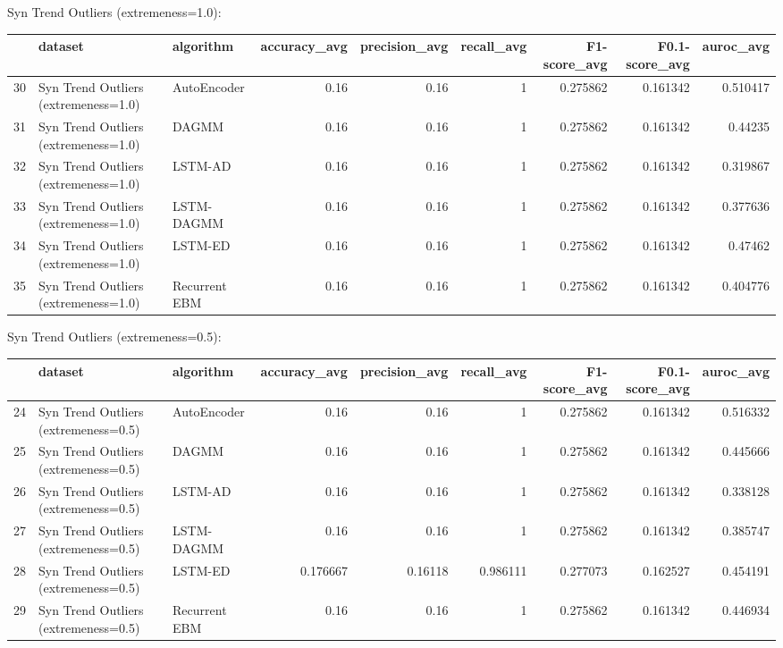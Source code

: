 Syn Trend Outliers (extremeness=1.0):

\begin{tabular}{rllrrrrrr}
\hline
    & dataset                              & algorithm     &   accuracy\_avg &   precision\_avg &   recall\_avg &   F1-score\_avg &   F0.1-score\_avg &   auroc\_avg \\
\hline
 30 & Syn Trend Outliers (extremeness=1.0) & AutoEncoder   &           0.16 &            0.16 &            1 &       0.275862 &         0.161342 &    0.510417 \\
 31 & Syn Trend Outliers (extremeness=1.0) & DAGMM         &           0.16 &            0.16 &            1 &       0.275862 &         0.161342 &    0.44235  \\
 32 & Syn Trend Outliers (extremeness=1.0) & LSTM-AD       &           0.16 &            0.16 &            1 &       0.275862 &         0.161342 &    0.319867 \\
 33 & Syn Trend Outliers (extremeness=1.0) & LSTM-DAGMM    &           0.16 &            0.16 &            1 &       0.275862 &         0.161342 &    0.377636 \\
 34 & Syn Trend Outliers (extremeness=1.0) & LSTM-ED       &           0.16 &            0.16 &            1 &       0.275862 &         0.161342 &    0.47462  \\
 35 & Syn Trend Outliers (extremeness=1.0) & Recurrent EBM &           0.16 &            0.16 &            1 &       0.275862 &         0.161342 &    0.404776 \\
\hline
\end{tabular}

Syn Trend Outliers (extremeness=0.5):

\begin{tabular}{rllrrrrrr}
\hline
    & dataset                              & algorithm     &   accuracy\_avg &   precision\_avg &   recall\_avg &   F1-score\_avg &   F0.1-score\_avg &   auroc\_avg \\
\hline
 24 & Syn Trend Outliers (extremeness=0.5) & AutoEncoder   &       0.16     &         0.16    &     1        &       0.275862 &         0.161342 &    0.516332 \\
 25 & Syn Trend Outliers (extremeness=0.5) & DAGMM         &       0.16     &         0.16    &     1        &       0.275862 &         0.161342 &    0.445666 \\
 26 & Syn Trend Outliers (extremeness=0.5) & LSTM-AD       &       0.16     &         0.16    &     1        &       0.275862 &         0.161342 &    0.338128 \\
 27 & Syn Trend Outliers (extremeness=0.5) & LSTM-DAGMM    &       0.16     &         0.16    &     1        &       0.275862 &         0.161342 &    0.385747 \\
 28 & Syn Trend Outliers (extremeness=0.5) & LSTM-ED       &       0.176667 &         0.16118 &     0.986111 &       0.277073 &         0.162527 &    0.454191 \\
 29 & Syn Trend Outliers (extremeness=0.5) & Recurrent EBM &       0.16     &         0.16    &     1        &       0.275862 &         0.161342 &    0.446934 \\
\hline
\end{tabular}

